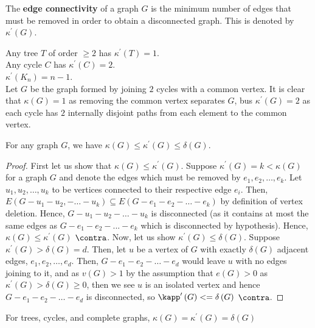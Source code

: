 \begin{definition}
	The \textbf{edge connectivity} of a graph $G$ is the minimum number of edges that must be removed in order to obtain a disconnected graph. This is denoted by  $\kappa^{\prime} \left( G \right) $.
\end{definition}
\begin{example}
	Any tree $T$ of order $\ge 2$ has $\kappa^{\prime} \left( T \right)  = 1$.\\
	Any cycle $C$ has $\kappa^{\prime} \left( C \right) = 2$.\\
	$\kappa^{\prime} \left( K_{n} \right) = n-1 $.\\
	Let $G$ be the graph formed by joining $2$ cycles with a common vertex. It is clear that $\kappa \left( G \right) = 1$ as removing the common vertex separates $G$, bus $\kappa^{\prime} \left( G \right) = 2$ as each cycle has $2$ internally disjoint paths from each element to the common vertex.
\end{example}
 \begin{theorem}
	 For any graph $G$, we have $\kappa \left( G \right)  \le \kappa^{\prime} \left( G \right) \le \delta \left( G \right)$.
\end{theorem}
\begin{proof}
	First let us show that $\kappa \left( G \right)  \le \kappa^{\prime}\left( G \right) $. Suppose $\kappa^{\prime} \left( G \right) = k < \kappa \left( G \right) $ for a graph $G$ and denote the edges which must be removed by $e_1, e_2, \ldots, e_{k}$. Let $u_1, u_2, \ldots, u_{k}$ to be vertices connected to their respective edge $e_{i}$. Then, $E\left(G - u_1 - u_2, - \ldots - u_{k}\right) \subseteq E\left( G - e_1 - e_2 - \ldots - e_{k} \right) $ by definition of vertex deletion. Hence,  $G - u_1 - u_2 - \ldots - u_{k}$ is disconnected (as it contains at most the same edges as $G - e_1 - e_2 - ... - e_{k}$ which is disconnected by hypothesis). Hence, $\kappa\left( G \right) \le \kappa^{\prime}\left( G \right) $ $\contra$. Now, let us show $\kappa^{\prime}\left( G \right) \le \delta \left( G \right) $. Suppose $\kappa^{\prime}\left( G \right) > \delta\left( G \right) = d$. Then, let $u$ be a vertex of $G$ with exactly $\delta\left( G \right) $ adjacent edges, $e_1, e_2, \ldots, e_{d}$. Then, $G - e_1 - e_2 - \ldots - e_{d}$ would leave $u$ with no edges joining to it, and as $v\left( G \right) > 1$ by the assumption that $e\left( G \right) > 0$ as $\kappa^{\prime}\left( G \right) > \delta\left( G \right) \ge 0$, then we see $u$ is an isolated vertex and hence $G - e_1 - e_2 - \ldots - e_{d}$ is disconnected, so $\kapp^{\prime}\left( G \right) <= \delta \left( G \right) $ $\contra$.
\end{proof}
\begin{remark}
	For trees, cycles, and complete graphs, $\kappa \left( G \right)  = \kappa^{\prime} \left( G \right) = \delta \left( G \right) $
\end{remark}
